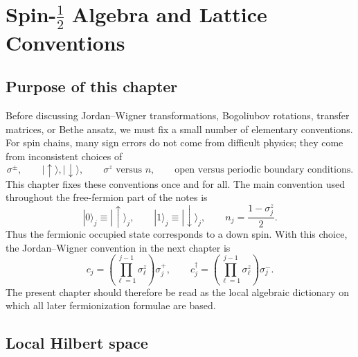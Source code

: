 \chapter{\texorpdfstring{Spin-$\frac12$ Algebra and Lattice Conventions}{Spin-1/2 Algebra and Lattice Conventions}}

\section{Purpose of this chapter}

Before discussing Jordan--Wigner transformations, Bogoliubov rotations, transfer
matrices, or Bethe ansatz, we must fix a small number of elementary conventions.
For spin chains, many sign errors do not come from difficult physics; they come
from inconsistent choices of
\begin{equation}
    \sigma^\pm,
    \qquad
    |\uparrow\rangle, |\downarrow\rangle,
    \qquad
    \sigma^z \text{ versus } n,
    \qquad
    \text{open versus periodic boundary conditions}.
\end{equation}
This chapter fixes these conventions once and for all. The main convention used
throughout the free-fermion part of the notes is
\begin{equation}
    |0\rangle_j\equiv |\uparrow\rangle_j,
    \qquad
    |1\rangle_j\equiv |\downarrow\rangle_j,
    \qquad
    n_j=\frac{1-\sigma_j^z}{2}.
\end{equation}
Thus the fermionic occupied state corresponds to a down spin. With this choice,
the Jordan--Wigner convention in the next chapter is
\begin{equation}
    c_j=
    \left(\prod_{\ell=1}^{j-1}\sigma_\ell^z\right)\sigma_j^+,
    \qquad
    c_j^\dagger=
    \left(\prod_{\ell=1}^{j-1}\sigma_\ell^z\right)\sigma_j^- .
\end{equation}
The present chapter should therefore be read as the local algebraic dictionary on
which all later fermionization formulae are based.

\section{Local Hilbert space}

